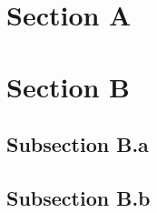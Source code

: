 


\section{Section A}
\label{subsection:a}

\lipsum[15-18]



\section{Section B}
\label{subsection:b}

\subsection{Subsection B.a}
\lipsum[19-21]

\subsection{Subsection B.b}
\lipsum[22-23]